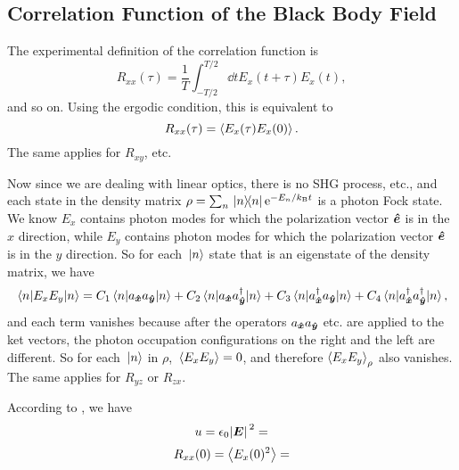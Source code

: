 \documentclass[hyperref, a4paper]{article}
\newcommand*{\ee}{\mathrm{e}}
\newcommand{\kB}{k_{\text{B}}}
\begin{document}
\subsection{Correlation Function of the Black Body Field}

The experimental definition of the correlation function is 
\begin{equation}
    R_{xx}(\tau) = \frac{1}{T} \int_{-T/2}^{T/2} \dd{t} E_x(t+\tau) E_x(t),
\end{equation}
and so on. 
Using the ergodic condition, this is equivalent to 
\begin{equation}
    R_{xx} (\tau) = \expval{E_x(\tau) E_x(0)}.
\end{equation}
The same applies for $R_{xy}$, etc. 

Now since we are dealing with linear optics, 
there is no SHG process, etc., 
and each state in the density matrix $\rho = \sum_n \dyad*{n}{n} \ee^{- E_n / \kB t}$
is a photon Fock state.
We know $E_x$ contains photon modes 
for which the polarization vector $\vu*{e}$ is in the $x$ direction,
while $E_y$ contains photon modes 
for which the polarization vector $\vu*{e}$ is in the $y$ direction.
So for each $\ket*{n}$ state that is an eigenstate of the density matrix, 
we have 
\[
    \expval{E_x E_y}{n} = C_1 \expval*{a_{\vu*{x}} a_{\vu*{y}}}{n} + 
    C_2 \expval*{a_{\vu*{x}} a^\dagger_{\vu*{y}}}{n} + 
    C_3 \expval*{a^\dagger_{\vu*{x}} a_{\vu*{y}}}{n} +
    C_4 \expval*{a^\dagger_{\vu*{x}} a^\dagger_{\vu*{y}}}{n},
\]
and each term vanishes because 
after the operators $a_{\vu*{x}} a_{\vu*{y}}$ etc. are applied to the ket vectors, 
the photon occupation configurations on the right and the left are different.
So for each $\ket*{n}$ in $\rho$,
$\expval*{E_x E_y} = 0$,
and therefore $\expval{E_x E_y}_\rho$ also vanishes. 
The same applies for $R_{yz}$ or $R_{zx}$.

According to , 
we have 
\begin{equation}
    u = \epsilon_0 \abs*{\vb*{E}}^2 = 
\end{equation}
\begin{equation}
    R_{xx}(0) = \expval{E_x(0)^2} = 
\end{equation}
\end{document}
